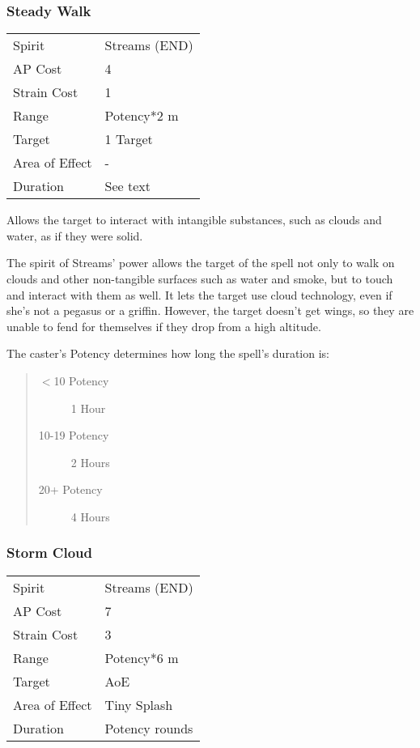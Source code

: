 \documentclass[11pt,a4paper,twocolumn]{book}
\begin{document}
\subsubsection*{Steady Walk}
{
	\begin{tabu} to 75mm{| X[l,4] | X[l,7] |}
		\hline
		Spirit 			& Streams (END) 	\\
		AP Cost	      	& 4 					\\
		Strain Cost     & 1 					\\
		Range     		& Potency*2 m			\\
		Target      	& 1 Target				\\
		Area of Effect  & - 	 				\\
		Duration     	& See text	            \\ \hline
	\end{tabu}
	
}

\medskip

Allows the target to interact with intangible substances, such as clouds and water, as if they were solid.

The spirit of Streams' power allows the target of the spell not only to walk on clouds and other non-tangible surfaces such as water and smoke, but to touch and interact with them as well. It lets the target use cloud technology, even if she's not a pegasus or a griffin. However, the target doesn't get wings, so they are unable to fend for themselves if they drop from a high altitude.

The caster's Potency determines how long the spell's duration is:

\begin{quote}
	\begin{description}
		\item[$<$10 Potency] 	1 Hour
		\item[10-19 Potency] 	2 Hours
		\item[20+ Potency] 		4 Hours
	\end{description}	
\end{quote}

\subsubsection*{Storm Cloud}
{
	\begin{tabu} to 75mm{| X[l,4] | X[l,7] |}
		\hline
		Spirit         & Streams (END)  \\
		AP Cost        & 7              \\
		Strain Cost    & 3              \\
		Range          & Potency*6 m    \\
		Target         & AoE            \\
		Area of Effect & Tiny Splash    \\
		Duration       & Potency rounds \\ \hline
	\end{tabu}
	
}
\end{document}
